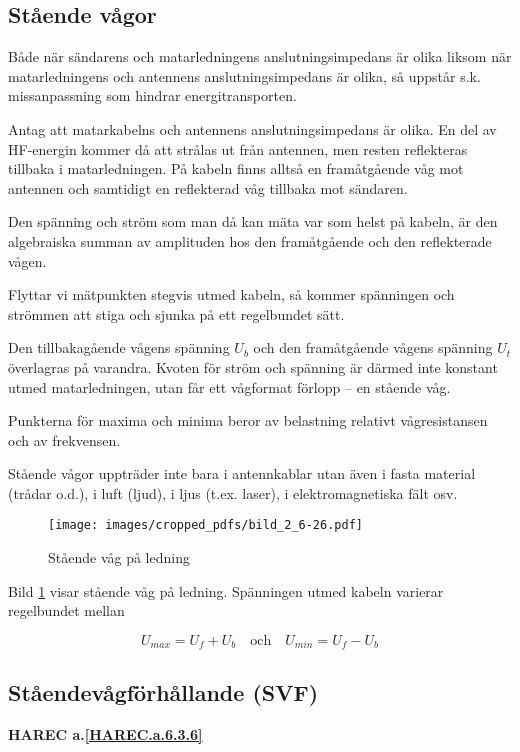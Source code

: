 \subsection{Stående vågor}

Både när sändarens och matarledningens anslutningsimpedans är olika
liksom när matarledningens och antennens anslutningsimpedans är olika,
så uppstår s.k. missanpassning som hindrar energitransporten.

Antag att matarkabelns och antennens anslutningsimpedans är olika.
En del av HF-energin kommer då att strålas ut från antennen, men resten
reflekteras tillbaka i matarledningen.
På kabeln finns alltså en framåtgående våg mot antennen och samtidigt en
reflekterad våg tillbaka mot sändaren.

Den spänning och ström som man då kan mäta var som helst på kabeln, är den
algebraiska summan av amplituden hos den framåtgående och den reflekterade
vågen.

Flyttar vi mätpunkten stegvis utmed kabeln, så kommer spänningen och
strömmen att stiga och sjunka på ett regelbundet sätt.

Den tillbakagående vågens spänning \(U_b\) och den framåtgående vågens
spänning \(U_t\) överlagras på varandra.
Kvoten för ström och spänning är därmed inte konstant utmed matarledningen,
utan får ett vågformat förlopp -- en stående våg.

Punkterna för maxima och minima beror av belastning relativt
vågresistansen och av frekvensen.

Stående vågor uppträder inte bara i antennkablar utan även i fasta material
(trådar o.d.), i luft (ljud), i ljus (t.ex. laser), i elektromagnetiska fält
osv.

\begin{figure}
  \texttt{[image: images/cropped\_pdfs/bild\_2\_6-26.pdf]}
  \caption{Stående våg på ledning}
  \label{fig:bildII6-26}
\end{figure}

Bild \ref{fig:bildII6-26} visar stående våg på ledning.
Spänningen utmed kabeln varierar regelbundet mellan

\[U_{max} = U_f + U_b \quad \text{och} \quad U_{min} = U_f - U_b\]

\subsection{Ståendevågförhållande (SVF)}
\textbf{
HAREC a.\ref{HAREC.a.6.3.6}\label{myHAREC.a.6.3.6}
}

